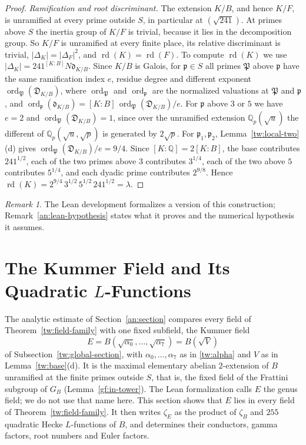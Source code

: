 \documentclass[11pt]{amsart}
\numberwithin{equation}{section}
\theoremstyle{definition}
\theoremstyle{remark}
\newtheorem{remark}[equation]{Remark}
\DeclareMathOperator{\rd}{rd}
\newcommand{\Q}{\mathbb Q}
\begin{document}
\begin{proof}
\emph{Ramification and root discriminant.} The extension $K/B$, and hence
$K/F$, is unramified at every prime outside $S$, in particular at
$(\sqrt{241})$. At primes above $S$ the inertia group of $K/F$ is trivial,
because it lies in the decomposition group. So $K/F$ is unramified at every
finite place, its relative discriminant is trivial, $|\Delta_K|=|\Delta_F|^2$,
and $\rd(K)=\rd(F)$. To compute $\rd(K)$ we use
$|\Delta_K|=241^{[K:B]}N\mathfrak d_{K/B}$. Since $K/B$ is Galois, for
$\mathfrak p\in S$ all primes $\mathfrak P$ above $\mathfrak p$ have the same
ramification index $e$, residue degree and different exponent
$\operatorname{ord}_{\mathfrak P}(\mathfrak D_{K/B})$, where
$\operatorname{ord}_{\mathfrak P}$ and $\operatorname{ord}_{\mathfrak p}$ are
the normalized valuations at $\mathfrak P$ and $\mathfrak p$, and
$\operatorname{ord}_{\mathfrak p}(\mathfrak d_{K/B})=[K:B]\,\operatorname{ord}_{\mathfrak P}(\mathfrak D_{K/B})/e$.
For $\mathfrak p$ above $3$ or $5$ we have $e=2$ and
$\operatorname{ord}_{\mathfrak P}(\mathfrak D_{K/B})=1$, since over the unramified extension
$\Q_p(\sqrt u)$ the different of $\Q_p(\sqrt u,\sqrt p)$ is generated by
$2\sqrt p$. For $\mathfrak p_1,\mathfrak p_2$, Lemma~\ref{tw:local-two}(d)
gives $\operatorname{ord}_{\mathfrak P}(\mathfrak D_{K/B})/e=9/4$. Since $[K:\Q]=2[K:B]$, the
base contributes $241^{1/2}$, each of the two primes above $3$ contributes
$3^{1/4}$, each of the two above $5$ contributes $5^{1/4}$, and each dyadic
prime contributes $2^{9/8}$. Hence
$\rd(K)=2^{9/4}\,3^{1/2}\,5^{1/2}\,241^{1/2}=\lambda$.
\end{proof}

\begin{remark}\label{tw:lean-remark}
The Lean development \cite{NaslundLean2026} formalizes a version of this
construction; Remark~\ref{an:lean-hypothesis} states what it proves and the
numerical hypothesis it assumes.
\end{remark}
\section{\texorpdfstring{The Kummer Field and Its Quadratic $L$-Functions}{The Kummer Field and Its Quadratic L-Functions}}\label{gf:section}

The analytic estimate of Section~\ref{an:section} compares every field of
Theorem~\ref{tw:field-family} with one fixed subfield, the Kummer field
\[
 E=B(\sqrt{\alpha_0},\ldots,\sqrt{\alpha_7})=B(\sqrt V)
\]
of Subsection~\ref{tw:global-section}, with $\alpha_0,\ldots,\alpha_7$ as in
\eqref{tw:alpha} and $V$ as in Lemma~\ref{tw:base}(d). It is the maximal
elementary abelian $2$-extension of $B$ unramified at the finite primes
outside $S$, that is, the fixed field of the Frattini subgroup of $G_B$
(Lemma~\ref{gf:in-tower}). The Lean formalization calls $E$ the genus field;
we do not use that name here.
This section shows that $E$ lies in every field of
Theorem~\ref{tw:field-family}. It then writes $\zeta_E$ as the product of
$\zeta_B$ and $255$ quadratic Hecke $L$-functions of $B$, and determines
their conductors, gamma factors, root numbers and Euler factors.
\end{document}
